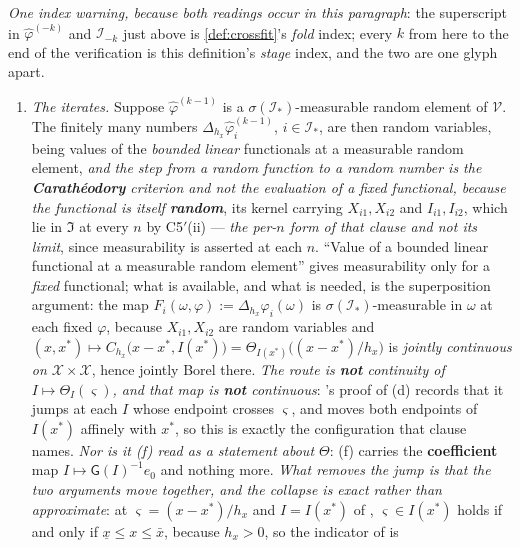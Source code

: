 \emph{One index warning, because both readings occur in this paragraph}: the
superscript in $\hat\varphi^{(-k)}$ and $\mathcal I_{-k}$ just above is \cref{def:crossfit}'s \emph{fold}
index; every $k$ from here to the end of the verification is this definition's \emph{stage} index, and the
two are one glyph apart.
\begin{enumerate}
\item[--] \emph{The iterates.} Suppose $\hat\varphi^{(k-1)}$ is a $\sigma(\mathcal I_\ast)$-measurable random
element of $\mathcal V$. The finitely many numbers $\Delta_{h_x}\hat\varphi^{(k-1)}_i$, $i\in\mathcal I_\ast$, are
then random variables, being values of the \emph{bounded linear} functionals  at a measurable
random element, \emph{and the step from a random function to a random number is the
\textbf{Carath\'eodory} criterion and not the evaluation of a fixed functional, because the functional
 is itself \textbf{random}}, its kernel carrying $X_{i1},X_{i2}$ and $I_{i1},I_{i2}$, which lie in $\mathfrak I$ at every $n$ by C5$'$(ii) --- \emph{the per-$n$ form of that clause and not its limit}, since measurability is asserted at each $n$.
``Value of a bounded linear functional at a measurable random element'' gives measurability only for a
\emph{fixed} functional; what is available, and what is needed, is the superposition argument: the map
$F_i(\omega,\varphi):=\Delta_{h_x}\varphi_i(\omega)$ is $\sigma(\mathcal I_\ast)$-measurable in $\omega$ at each
fixed $\varphi$, because $X_{i1},X_{i2}$ are random variables and
$(x,x^\ast)\mapsto C_{h_x}\big(x-x^\ast,I(x^\ast)\big)=\Theta_{I(x^\ast)}\big((x-x^\ast)/h_x\big)$ is
\emph{jointly continuous on $\mathcal X\times\mathcal X$}, hence jointly Borel there.
\emph{The route is \textbf{not} continuity of $I\mapsto\Theta_I(\varsigma)$, and that map is
\textbf{not} continuous}: 's proof of \textup{(d)} records that it jumps at
each $I$ whose endpoint crosses $\varsigma$, and  moves both endpoints of $I(x^\ast)$
affinely with $x^\ast$, so this is exactly the configuration that clause names. \emph{Nor is it
\textup{(f)} read as a statement about $\Theta$}: \textup{(f)} carries the \textbf{coefficient} map
$I\mapsto\mathsf G(I)^{-1}e_0$ and nothing more. \emph{What removes the jump is that the two arguments
move together, and the collapse is exact rather than approximate}: at $\varsigma=(x-x^\ast)/h_x$ and
$I=I(x^\ast)$ of , $\varsigma\in I(x^\ast)$ holds if and only if
$\underline x\le x\le\bar x$, because $h_x>0$, so the indicator of  is

\end{enumerate}
